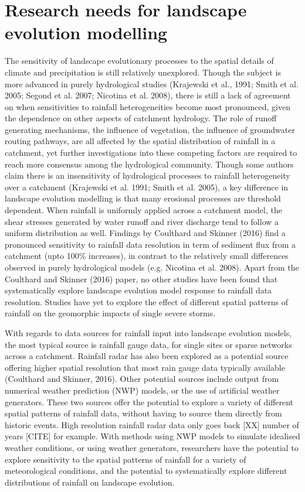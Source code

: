 \documentclass[12pt,oneside,PhD]{muthesis}
\begin{document}
\section{Research needs for landscape evolution modelling}

The sensitivity of landscape evolutionary processes to the spatial details of climate and precipitation is still relatively unexplored. Though the subject is more advanced in purely hydrological studies (Krajewski et al., 1991; Smith et al. 2005; Segond et al. 2007; Nicotina et al. 2008), there is still a lack of agreement on when sensitivities to rainfall heterogeneities become most pronounced, given the dependence on other aspects of catchment hydrology. The role of runoff generating mechanisms, the influence of vegetation, the influence of groundwater routing pathways, are all affected by the spatial distribution of rainfall in a catchment, yet further investigations into these competing factors are required to reach more consensus among the hydrological community. Though some authors claim there is an insensitivity of hydrological processes to rainfall heterogeneity over a catchment (Krajewski et al. 1991; Smith et al. 2005), a key difference in landscape evolution modelling is that many erosional processes are threshold dependent. When rainfall is uniformly applied across a catchment model, the shear stresses generated by water runoff and river discharge tend to follow a uniform distribution as well. Findings by Coulthard and Skinner (2016) find a pronounced sensitivity to rainfall data resolution in term of sediment flux from a catchment (upto 100\% increases), in contrast to the relatively small differences observed in purely hydrological models (e.g. Nicotina et al. 2008). Apart from the Coulthard and Skinner (2016) paper, no other studies have been found that systematically explore landscape evolution model response to rainfall data resolution. Studies have yet to explore the effect of different spatial patterns of rainfall on the geomorphic impacts of single severe storms. 

With regards to data sources for rainfall input into landscape evolution models, the most typical source is rainfall gauge data, for single sites or sparse networks across a catchment. Rainfall radar has also been explored as a potential source offering higher spatial resolution that most rain gauge data typically available (Coulthard and Skinner, 2016). Other potential sources include output from numerical weather prediction (NWP) models, or the use of artificial weather generators. These two sources offer the potential to explore a variety of different spatial patterns of rainfall data, without having to source them directly from historic events. High resolution rainfall radar data only goes back [XX] number of years [CITE] for example. With methods using NWP models to simulate idealised weather conditions, or using weather generators, researchers have the potential to explore sensitivity to the spatial patterns of rainfall for a variety of meteorological conditions, and the potential to systematically explore different distributions of rainfall on landscape evolution. 
\end{document}
